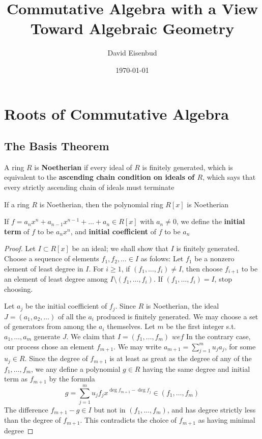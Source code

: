 \documentclass[11pt]{article}
\author{David Eisenbud}
\date{\today}
\title{Commutative Algebra with a View Toward Algebraic Geometry}
\begin{document}
\maketitle
\tableofcontents \clearpage\section{Roots of Commutative Algebra}
\label{sec:orga73c4db}
\subsection{The Basis Theorem}
\label{sec:org9dfa641}
A ring \(R\) is \textbf{Noetherian} if every ideal of \(R\) is finitely generated,
which is equivalent to the \textbf{ascending chain condition on ideals of \(R\)},
which says that every strictly ascending chain of ideals must terminate

\begin{theorem}
If a ring \(R\) is Noetherian, then the polynomial ring \(R[x]\) is Noetherian
\end{theorem}

If \(f=a_nx^n+a_{n-1}x^{n-1}+\dots+a_n\in R[x]\) with \(a_n\neq0\), we define
the \textbf{initial term} of \(f\) to be \(a_nx^n\), and \textbf{initial coefficient} of \(f\)
to be \(a_n\)

\begin{proof}
Let \(I\subset R[x]\) be an ideal; we shall show that \(I\) is finitely
generated. Choose a sequence of elements \(f_1,f_2,\dots\in I\) as folows:
Let \(f_1\) be a nonzero element of least degree in \(I\). For \(i\ge1\), if
\((f_1,\dots,f_i)\neq I\), then choose \(f_{i+1}\) to be an element of least
degree among \(I\setminus(f_1,\dots,f_i)\). If \((f_1,\dots,f_i)=I\), stop
choosing.

Let \(a_j\) be the initial coefficient of \(f_j\). Since \(R\) is Noetherian,
the ideal \(J=(a_1,a_2,\dots)\) of all the \(a_i\) produced is finitely
generated. We may choose a set of generators from among the \(a_i\)
themselves. Let \(m\) be the first integer s.t. \(a_1,\dots,a_m\) generate
\(J\). We claim that \(I=(f_1,\dots,f_m)\)
$wef$
In the contrary case, our process chose an element \(f_{m+1}\). We may write
\(a_{m+1}=\displaystyle\sum_{j=1}^mu_ja_j\), for some \(u_j\in R\). Since the
degree of \(f_{m+1}\) is at least as great as the degree of any of the
\(f_1,\dots,f_m\), we any define a polynomial \(g\in R\) having the same
degree and initial term as \(f_{m+1}\) by the formula
\begin{equation*}
g=\sum_{j=1}^mu_jf_jx^{\deg f_{m+1}-\deg f_j}\in (f_1,\dots,f_m)
\end{equation*}
The difference \(f_{m+1}-g\in I\) but not in \((f_1,\dots,f_m)\), and has
degree strictly less than the degree of \(f_{m+1}\). This contradicts the
choice of \(f_{m+1}\) as having minimal degree
\end{proof}
\end{document}
